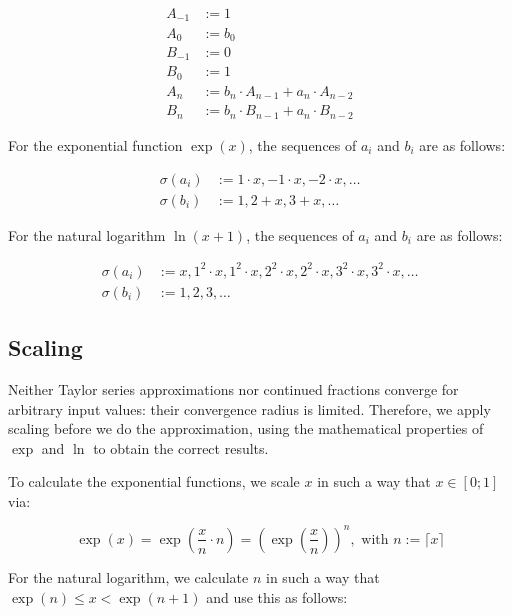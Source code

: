 \documentclass[11pt,a4paper,dvipsnames,twosided]{article}
\theoremstyle{definition}
\theoremstyle{definition}
\begin{document}
\begin{align*}
  A_{-1} & :=  1 \\
  A_{0} & :=  b_{0} \\
  B_{-1} & :=  0 \\
  B_{0} & := 1 \\
  A_{n} & :=  b_{n}\cdot A_{n-1} + a_{n}\cdot A_{n-2} \\
  B_{n} & :=  b_{n}\cdot B_{n-1} + a_{n}\cdot B_{n-2}
\end{align*}

For the exponential function $\exp(x)$, the sequences of $a_{i}$ and $b_{i}$ are
as follows:

\begin{align*}
  \sigma(a_{i}) & := 1 \cdot x, -1 \cdot x, -2 \cdot x, \ldots \\
  \sigma(b_{i}) & := 1, 2 + x, 3 + x, \ldots
\end{align*}

For the natural logarithm $\ln(x+1)$, the sequences of $a_{i}$ and $b_{i}$ are
as follows:

\begin{align*}
  \sigma(a_{i}) & := x, 1^{2}\cdot x, 1^{2}\cdot x, 2^{2}\cdot x, 2^{2}\cdot x, 3^{2}\cdot
          x, 3^{2}\cdot x, \ldots\\
  \sigma(b_{i}) & := 1, 2, 3, \ldots
\end{align*}

\subsection{Scaling}
\label{sec:scaling}

Neither Taylor series approximations nor continued fractions converge for arbitrary input
values: their convergence radius is limited. Therefore, we apply scaling before
we do the approximation, using the mathematical properties of $\exp$ and $\ln$
to obtain the correct results.

To calculate the exponential functions, we scale $x$ in such a way that
$x \in [0; 1]$ via:

\begin{equation*}
  \exp(x) = \exp
  \left(
    \frac{x}{n}\cdot n
  \right) =
  {\left(
      \exp{
        \left(
          \frac{x}{n}
        \right)}
    \right)}^{n}, \text{ with } n := \lceil x \rceil
\end{equation*}

For the natural logarithm, we calculate $n$ in such a way that
$\exp(n) \leq x < \exp(n+1)$ and use this as follows:
\end{document}
